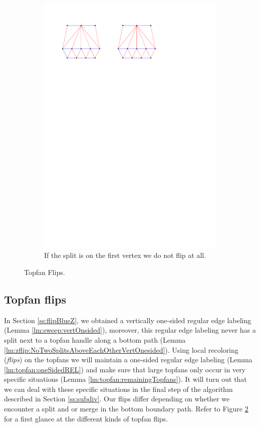 \begin{figure}[!b]
\begin{subfigure}[b]{0.45 \textwidth}
        \includegraphics[width =\textwidth]{topFanFlips/img/splitfront}
        \caption{If the split is on the first vertex we do not flip at all.}
        \label{fig:fanflip:splitFirstVertex}
    \end{subfigure}

    \caption{Topfan Flips.}
    \label{fig:fanflip:fanflips}
\end{figure}

\subsection{Topfan flips}
\thispagestyle{plain}
\label{ss:fanflip}

In Section \ref{ss:flipBlueZ}, we obtained a vertically one-sided regular edge labeling (Lemma \ref{lm:sweep:vertOnsided}), moreover, this regular edge labeling never has a split next to a topfan handle along a bottom path (Lemma \ref{lm:zflip:NoTwoSplitsAboveEachOtherVertOnesided}).
Using local recoloring (\emph{flips}) on the topfans we will maintain a one-sided regular edge labeling (Lemma \ref{lm:topfan:oneSidedREL}) and make sure that large topfans only occur in very specific situations (Lemma \ref{lm:topfan:remainingTopfans}). It will turn out that we can deal with these specific situations in the final step of the algorithm described in Section \ref{ss:subdiv}.
Our flips differ depending on whether we encounter a split and or merge in the bottom boundary path.
Refer to Figure \ref{fig:fanflip:fanflips} for a first glance at the different kinds of topfan flips.


